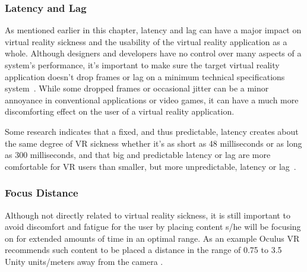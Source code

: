 \subsubsection{Latency and Lag}
As mentioned earlier in this chapter, latency and lag can have a major impact on virtual reality sickness and the usability of the virtual reality application as a whole.
Although designers and developers have no control over many aspects of a system's performance, it's important to make sure the target virtual reality application
doesn't drop frames or lag on a minimum technical specifications system~\citep{OCULUS2016}. While some dropped frames or occasional jitter can be a minor annoyance
in conventional applications or video games, it can have a much more discomforting effect on the user of a virtual reality application. 

Some research indicates that a fixed, and thus predictable, latency creates about the same degree of VR sickness whether it's as short as 48 milliseconds or as long 
as 300 milliseconds, and that big and predictable latency or lag are more comfortable for VR users than smaller, but more unpredictable, latency or lag~\citep{Draper2001}. 

\subsubsection{Focus Distance}
\label{sec:focus_distance}
Although not directly related to virtual reality sickness, it is still important to avoid discomfort and fatigue for the user by placing content s/he will be focusing on 
for extended amounts of time in an optimal range.
As an example Oculus VR recommends such content to be placed a distance in the range of 0.75 to 3.5 Unity units/meters away from the camera \citep{OCULUS2016}. 




